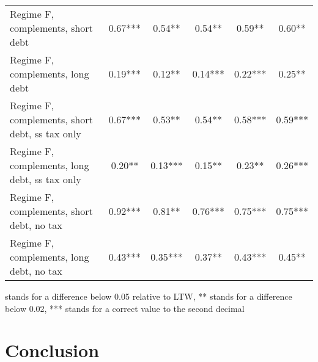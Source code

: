 \documentclass[letterpaper,12pt]{article}%
\begin{document}
\begin{table}[H]
\begin{threeparttable}
\begin{tabular}{l c c c c c}
     \quad Regime F, complements, short debt &  0.67*** & 0.54**  &  0.54** & 0.59** & 0.60**  \\
     \quad Regime F, complements, long debt &   0.19*** & 0.12** & 0.14*** & 0.22***  & 0.25** \\
     \quad Regime F, complements, short debt, ss tax only &  0.67*** & 0.53** & 0.54**  & 0.58*** & 0.59*** \\
     \quad Regime F, complements, long debt, ss tax only &  0.20**  & 0.13*** & 0.15**  & 0.23**  &  0.26*** \\
     \quad Regime F, complements, short debt, no tax &  0.92*** & 0.81**   & 0.76***  & 0.75***  & 0.75*** \\
     \quad Regime F, complements, long debt, no tax &   0.43*** & 0.35*** & 0.37**  & 0.43*** & 0.45** \\
    \bottomrule    
    \end{tabular}
    \begin{tablenotes}
    \item * stands for a difference below 0.05 relative to LTW, ** stands for a difference below 0.02, *** stands for a correct value to the second decimal
    \end{tablenotes}
    \label{tab:my_label}
    \end{threeparttable}
\end{table}




\section{Conclusion}
\end{document}
